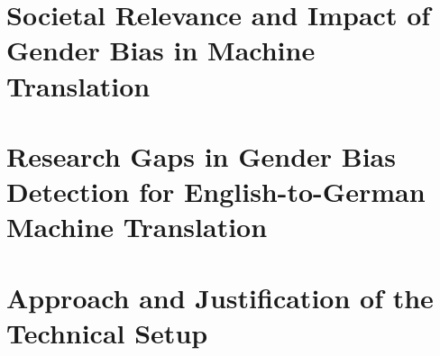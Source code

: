 
\section{Societal Relevance and Impact of Gender Bias in Machine Translation}


\section{Research Gaps in Gender Bias Detection for English-to-German Machine Translation}


\section{Approach and Justification of the Technical Setup}

